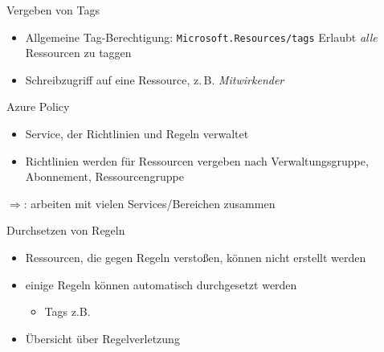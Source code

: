 \begin{flashcard}[Definition]{Vergeben von Tags}
  \begin{itemize}
    \item Allgemeine Tag-Berechtigung: \texttt{Microsoft.Resources/tags}\newline
      Erlaubt \emph{alle} Ressourcen zu taggen 
    \item Schreibzugriff auf eine Ressource, z.\,B. \emph{Mitwirkender}
  \end{itemize}
\end{flashcard}


\begin{flashcard}[Definition]{Azure Policy}
  \begin{itemize}
    \item Service, der Richtlinien und Regeln verwaltet
    \item Richtlinien werden für Ressourcen vergeben nach\newline
      Verwaltungsgruppe, Abonnement, Ressourcengruppe
  \end{itemize}
  $\Rightarrow$: arbeiten mit vielen Services/Bereichen zusammen
\end{flashcard}

\begin{flashcard}[Definition]{Durchsetzen von Regeln}
  \begin{itemize}
    \item Ressourcen, die gegen Regeln verstoßen, können nicht erstellt werden
    \item einige Regeln können automatisch durchgesetzt werden
    \begin{itemize}
      \item Tags z.B.
    \end{itemize}
    \item Übersicht über Regelverletzung
  \end{itemize}
\end{flashcard}

